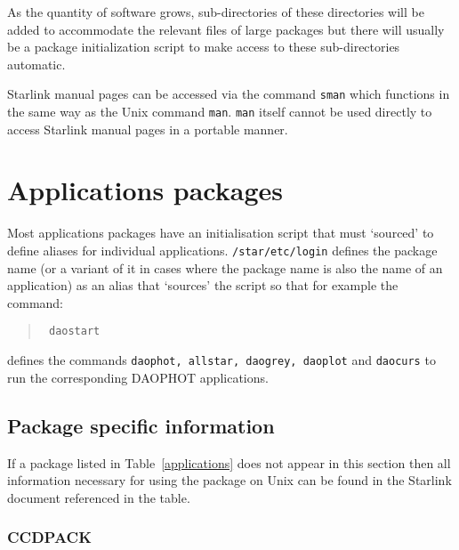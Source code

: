 As the quantity of software grows, sub-directories of these directories
will be added to accommodate the relevant files of large packages but
there will usually be a package initialization script
to make access to these sub-directories automatic.

Starlink manual pages can be accessed via the command {\tt sman} which
functions in the same way as the Unix command {\tt man}. {\tt man} itself
cannot be used directly to access Starlink manual pages in a portable
manner.

\section{Applications packages}

Most applications packages have an initialisation script that must `sourced' to
define aliases for individual applications. {\tt /star\-/etc\-/login} defines
the package name (or a variant of it in cases where the package name is
also the name of an application) as an alias that `sources' the script so
that for example the command:
\begin{quote}\tt
daostart
\end{quote}
defines the commands {\tt daophot, allstar, daogrey, daoplot} and
{\tt daocurs} to run the corresponding
DAOPHOT applications.

\subsection{Package specific information}

If a package listed in
Table~\ref{applications} does not appear in this section then all information
necessary for using the package on Unix can be found in the Starlink document
referenced in the table.

\subsubsection{CCDPACK}

